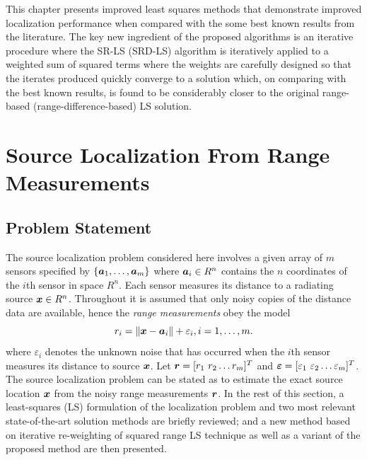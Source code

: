 This chapter presents improved least squares methods that demonstrate improved localization performance when compared with the some best known results from the literature. The key new ingredient of the proposed algorithms is an iterative procedure where the SR-LS (SRD-LS) algorithm is iteratively applied to a weighted sum of squared terms where the weights are carefully designed so that the iterates produced quickly converge to a solution which, on comparing with the best known results, is found to be considerably closer to the original range-based (range-difference-based) LS solution. %



\section{Source Localization From Range Measurements}%
\subsection{Problem Statement}%


The source localization problem considered here involves a given array of $m$ sensors specified by $\{\mbox{\boldmath$a$}_1,\ldots, \mbox{\boldmath$a$}_m\}$ where $\mbox{\boldmath$a$}_i\in R^n$  contains the $n$ coordinates of the $i$th sensor in space $R^n$. Each sensor measures its distance to a radiating source $\mbox{\boldmath$x$}\in R^n$. Throughout it is assumed that only noisy copies of the distance data are available, hence the \textit{range measurements} obey the model
\begin{equation} \label{eq:3.1}
\setcounter{equation}{1}
r_i = \|{\Bx} - {\Ba}_i\| + \varepsilon_i, i = 1,\ldots , m.
\end{equation}                                                                                                     	where $\varepsilon_i$ denotes the unknown noise that has occurred when the $i$th sensor measures its distance to source $\mbox{\boldmath$x$}$. Let $\mbox{\boldmath$r$}=[r_1 \ r_2 \ldots r_m]^T$ and $\mbox{\boldmath${\varepsilon}$}=[\varepsilon_1 \ \varepsilon_2 \ldots \varepsilon_m]^T$. The source localization problem can be stated as to estimate the exact source location $\mbox{\boldmath$x$}$ from the noisy range measurements $\mbox{\boldmath$r$}$. In the rest of this section, a least-squares (LS) formulation of the localization problem and two most relevant state-of-the-art solution methods are briefly reviewed; and a new method based on iterative re-weighting of squared range LS technique as well as a variant of the proposed method are then presented. %

